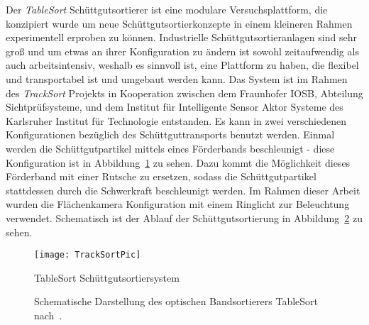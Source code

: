 Der \textit{TableSort} Schüttgutsortierer ist eine modulare Versuchsplattform, die konzipiert wurde um neue Schüttgutsortierkonzepte in einem kleineren Rahmen experimentell erproben zu können.
Industrielle Schüttgutsortieranlagen sind sehr groß und um etwas an ihrer Konfiguration zu ändern ist sowohl zeitaufwendig als auch arbeitsintensiv, 
weshalb es sinnvoll ist, eine Plattform zu haben, die flexibel und transportabel ist und umgebaut werden kann.
Das System ist im Rahmen des \textit{TrackSort} Projekts in Kooperation zwischen dem Fraunhofer IOSB, Abteilung Sichtprüfsysteme, und dem Institut für Intelligente Sensor Aktor Systeme des Karlsruher Institut für Technologie entstanden\cite{doll2015}.
Es kann in zwei verschiedenen Konfigurationen bezüglich des Schüttguttransports benutzt werden.
Einmal werden die Schüttgutpartikel mittels eines Förderbands beschleunigt - diese Konfiguration ist in Abbildung~\ref{fig:tablesortsystem} zu sehen.
Dazu kommt die Möglichkeit dieses Förderband mit einer Rutsche zu ersetzen, sodass die Schüttgutpartikel stattdessen durch die Schwerkraft beschleunigt werden. 
Im Rahmen dieser Arbeit wurden die Flächenkamera Konfiguration mit einem Ringlicht zur Beleuchtung verwendet.
Schematisch ist der Ablauf der Schüttgutsortierung in Abbildung~\ref{fig:aufbau_tablesort} zu sehen.
\begin{figure}[h]
	\texttt{[image: TrackSortPic]}
	\caption{TableSort Schüttgutsortiersystem \cite{fraunhoferiosb2017}}
	\label{fig:tablesortsystem}
\end{figure}


\begin{figure}[h]
    \centering
    \def\svgwidth{\columnwidth}
	
	\caption[Schematische Darstellung des optischen Bandsortierers TableSort nach~\cite{Pfaff2017}.]{
		Schematische Darstellung des optischen Bandsortierers TableSort nach~\cite{Pfaff2017}.
	}
	\label{fig:aufbau_tablesort}

\end{figure}


